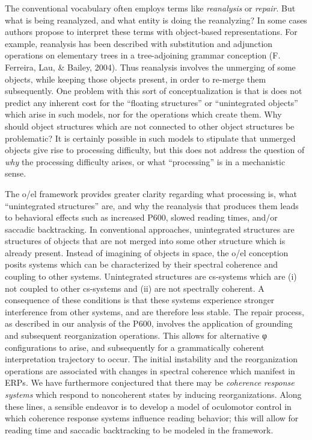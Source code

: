 The conventional vocabulary often employs terms like \textit{reanalysis} or \textit{repair}. But what is being reanalyzed, and what entity is doing the reanalyzing? In some cases authors propose to interpret these terms with object-based representations. For example, reanalysis has been described with substitution and adjunction operations on elementary trees in a tree-adjoining grammar conception (F. Ferreira, Lau, \& Bailey, 2004). Thus reanalysis involves the unmerging of some objects, while keeping those objects present, in order to re-merge them subsequently. One problem with this sort of conceptualization is that is does not predict any inherent cost for the “floating structures” or “unintegrated objects” which arise in such models, nor for the operations which create them. Why should object structures which are not connected to other object structures be problematic? It is certainly possible in such models to stipulate that unmerged objects give rise to processing difficulty, but this does not address the question of \textit{why} the processing difficulty arises, or what “processing” is in a mechanistic sense.

The o/el framework provides greater clarity regarding what processing is, what “unintegrated structures” are, and why the reanalysis that produces them leads to behavioral effects such as increased P600, slowed reading times, and/or saccadic backtracking. In conventional approaches, unintegrated structures are structures of objects that are not merged into some other structure which is already present. Instead of imagining of objects in space, the o/el conception posits systems which can be characterized by their spectral coherence and coupling to other systems. Unintegrated structures are cs-systems which are (i) not coupled to other cs-systems and (ii) are not spectrally coherent. A consequence of these conditions is that these systems experience stronger interference from other systems, and are therefore less stable. The repair process, as described in our analysis of the P600, involves the application of grounding and subsequent reorganization operations. This allows for alternative φ configurations to arise, and subsequently for a grammatically coherent interpretation trajectory to occur. The initial instability and the reorganization operations are associated with changes in spectral coherence which manifest in ERPs. We have furthermore conjectured that there may be \textit{coherence} \textit{response} \textit{systems} which respond to noncoherent states by inducing reorganizations. Along these lines, a sensible endeavor is to develop a model of oculomotor control in which coherence response systems influence reading behavior; this will allow for reading time and saccadic backtracking to be modeled in the framework.

